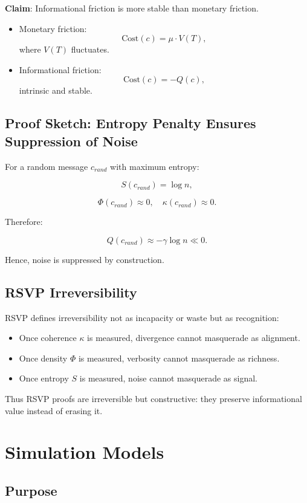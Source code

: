 \documentclass[openany]{book}
\begin{document}
\textbf{Claim}: Informational friction is more stable than monetary friction.

\begin{itemize}
    \item Monetary friction:
    \[ \text{Cost}(c) = \mu \cdot V(T), \]
    where $V(T)$ fluctuates.
    \item Informational friction:
    \[ \text{Cost}(c) = -Q(c), \]
    intrinsic and stable.
\end{itemize}

\section{Proof Sketch: Entropy Penalty Ensures Suppression of Noise}

For a random message $c_{rand}$ with maximum entropy:

\[ S(c_{rand}) = \log n, \]

\[ \Phi(c_{rand}) \approx 0, \quad \kappa(c_{rand}) \approx 0. \]

Therefore:

\[ Q(c_{rand}) \approx -\gamma \log n \ll 0. \]

Hence, noise is suppressed by construction.

\section{RSVP Irreversibility}

RSVP defines irreversibility not as incapacity or waste but as recognition:

\begin{itemize}
    \item Once coherence $\kappa$ is measured, divergence cannot masquerade as alignment.
    \item Once density $\Phi$ is measured, verbosity cannot masquerade as richness.
    \item Once entropy $S$ is measured, noise cannot masquerade as signal.
\end{itemize}

Thus RSVP proofs are irreversible but constructive: they preserve informational value instead of erasing it.

\chapter{Simulation Models}

\section{Purpose}
\end{document}
